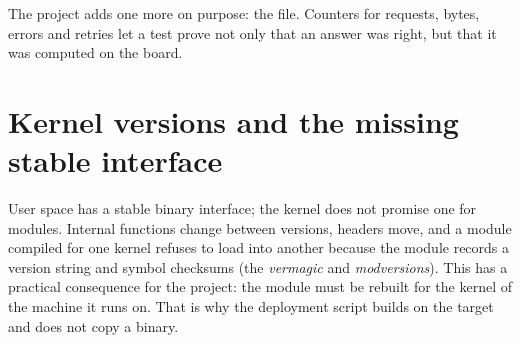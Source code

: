 The project adds one more on purpose: the  file. Counters for requests, bytes, errors and retries let a test prove not only that an answer was right, but that it was computed on the board.

\section{Kernel versions and the missing stable interface}

User space has a stable binary interface; the kernel does not promise one for modules. Internal functions change between versions, headers move, and a module compiled for one kernel refuses to load into another because the module records a version string and symbol checksums (the \emph{vermagic} and \emph{modversions}). This has a practical consequence for the project: the module must be rebuilt for the kernel of the machine it runs on. That is why the deployment script builds on the target and does not copy a binary.
